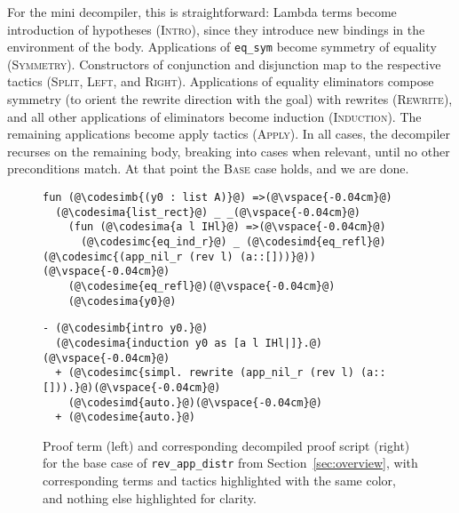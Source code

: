For the mini decompiler, this is straightforward: Lambda terms become introduction of hypotheses (\textsc{Intro}), since they introduce new bindings
in the environment of the body. Applications of \lstinline{eq_sym} become symmetry of equality (\textsc{Symmetry}).
Constructors of conjunction and disjunction map to the respective tactics (\textsc{Split}, \textsc{Left}, and \textsc{Right}).
Applications of equality eliminators compose symmetry (to orient the rewrite direction with the goal) with rewrites (\textsc{Rewrite}),
and all other applications of eliminators become induction (\textsc{Induction}).
The remaining applications become apply tactics (\textsc{Apply}).
In all cases, the decompiler recurses on the remaining body, breaking into cases when relevant, until no other preconditions match.
At that point the \textsc{Base} case holds, and we are done.

\begin{figure*}
\begin{minipage}{0.54\textwidth}
\begin{lstlisting}
fun (@\codesimb{(y0 : list A)}@) =>(@\vspace{-0.04cm}@)
  (@\codesima{list_rect}@) _ _(@\vspace{-0.04cm}@)
    (fun (@\codesima{a l IHl}@) =>(@\vspace{-0.04cm}@)
      (@\codesimc{eq_ind_r}@) _ (@\codesimd{eq_refl}@) (@\codesimc{(app_nil_r (rev l) (a::[]))}@))(@\vspace{-0.04cm}@)
    (@\codesime{eq_refl}@)(@\vspace{-0.04cm}@)
    (@\codesima{y0}@)
\end{lstlisting}
\end{minipage}
\hfill
\begin{minipage}{0.44\textwidth}
\begin{lstlisting}
- (@\codesimb{intro y0.}@)
  (@\codesima{induction y0 as [a l IHl|]}.@)(@\vspace{-0.04cm}@)
  + (@\codesimc{simpl. rewrite (app_nil_r (rev l) (a::[])).}@)(@\vspace{-0.04cm}@)
    (@\codesimd{auto.}@)(@\vspace{-0.04cm}@)
  + (@\codesime{auto.}@)
\end{lstlisting}
\end{minipage}
\vspace{-0.3cm}
\caption{Proof term (left) and corresponding decompiled proof script (right) for the base case of 
\lstinline{rev_app_distr} from Section~\ref{sec:overview}, with corresponding terms and tactics 
highlighted with the same color, and nothing else highlighted for clarity.}
\label{fig:rainbow}
\end{figure*}

